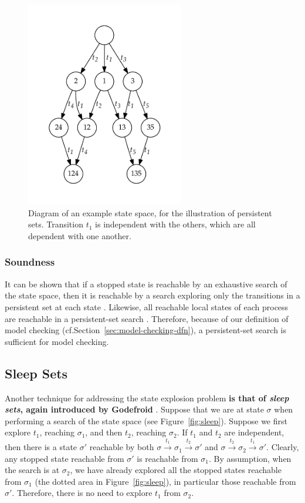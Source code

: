 \documentclass[12pt,a4paper,twoside,openright]{report}
\begin{document}
\begin{figure}
	\centering
	\includegraphics[height=9cm]{persistent1}
	\caption[Diagram of an example state space, for
	the illustration of persistent sets.]
		{Diagram of an example state space, for
		the illustration of persistent sets. Transition
		$t_1$ is independent with the others, which are
		all dependent with one another.}
	\label{fig:persistent}
\end{figure}

\subsubsection{Soundness}
It can be shown that if a stopped
state is reachable by an exhaustive
search of the state space, then
it is reachable by a search exploring
only the transitions in a persistent set
at each state \cite[Theorem~4.3]{god96}.
Likewise, all reachable
local states of each process are reachable
in a persistent-set search
\cite[Theorem~6.14]{god96}.
Therefore, because of our
definition of model checking
(cf.\@ Section~\ref{sec:model-checking-dfn}),
a persistent-set search is sufficient for
model checking.

\subsection{Sleep Sets}
\label{sec:sleep-prep}
Another technique for addressing the state explosion
problem \textbf{is that of \emph{sleep sets}, again introduced
by Godefroid }\cite{god91}. Suppose that
we are at state $\sigma$ when performing a search
of the state space (see Figure~\ref{fig:sleep}).
Suppose we first explore $t_1$, reaching $\sigma_1$,
and then $t_2$, reaching $\sigma_2$.
If $t_1$ and $t_2$ are independent, then there
is a state $\sigma'$ reachable by both
$\sigma \xrightarrow{t_1} \sigma_1
\xrightarrow{t_2} \sigma'$ and
$\sigma \xrightarrow{t_2} \sigma_2
\xrightarrow{t_1} \sigma'$.
Clearly, any stopped state reachable from $\sigma'$
is reachable from $\sigma_1$. By assumption,
when the search is at $\sigma_2$, we have already
explored all the stopped states reachable from
$\sigma_1$ (the dotted area in Figure~\ref{fig:sleep}),
in particular those reachable from
$\sigma'$. Therefore, there is no need to
explore $t_1$ from $\sigma_2$.
\end{document}
